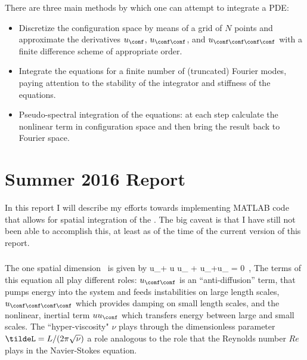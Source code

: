 There are three main methods by which one can attempt to integrate a PDE:
\begin{itemize}
\item Discretize the configuration space by means of a grid of $N$ points
    and approximate the derivatives $u_\conf$, $u_{\conf \conf}$, and
    $u_{\conf \conf \conf \conf}$ with a finite difference scheme of
    appropriate order.
\item Integrate the equations for a finite number of (truncated) Fourier
    modes, paying attention to the stability of the integrator and
    stiffness of the equations.
\item Pseudo-spectral integration of the equations: at each step calculate
    the nonlinear term in configuration space and then bring
    the result back to Fourier space.

\end{itemize}


\section{Summer 2016 Report}
\label{sect:MNGsumm16}

In this report I will describe my efforts towards implementing MATLAB
code that allows for spatial integration of the \KSe. The big caveat is
that I have still not been able to accomplish this, at least as of the
time of the current version of this report.

\subsubsection{\KSe}
\label{sect:MNGkse}


The one spatial dimension \KSe\ is given by
\beq
    u_\zeit + u u_\conf
    + u_{\conf \conf}+\nu u_{\conf \conf \conf \conf} = 0 \,,
    \label{e-MNGre1}
\eeq
The terms of this equation all play different roles: $u_{\conf \conf}$
is an ``anti-diffusion'' term, that pumps energy into the system and
feeds instabilities on large length scales,
$u_{\conf \conf \conf \conf}$ which provides damping on small  length scales, and
the nonlinear, inertial term $u u_\conf$ which transfers energy between
large and small scales. The ``hyper-viscosity" $\nu$ plays through
the dimensionless parameter $\tildeL = L/(2\pi \sqrt{\nu})$ a role analogous
to the role that the Reynolds number $Re$ plays in the Navier-Stokes equation.

